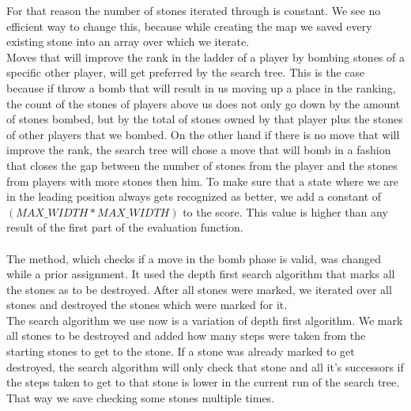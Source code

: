 For that reason the number of stones iterated through is constant. 
We see no efficient way to change this, because while creating the map we saved every existing stone into an array over which we iterate. \\\newpage
Moves that will improve the rank in the ladder of a player by bombing stones of a specific other player, will get preferred by the search tree.
This is the case because if throw a bomb that will result in us moving up a place in the ranking, the count of the stones of players above us does not only go down by the amount of stones bombed, but by the total of stones owned by that player plus the stones of other players that we bombed.
On the other hand if there is no move that will improve the rank, the search tree will chose a move that will bomb in a fashion that closes the gap between the number of stones from the player and the stones from players with more stones then him. To make sure that a state where we are in the leading position always gets recognized as better, we add a constant of $(MAX\_WIDTH*MAX\_WIDTH)$ to the score. This value is higher than any result of the first part of the evaluation function.\\\\
The method, which checks if a move in the bomb phase is valid, was changed while a prior assignment. 
It used the depth first search algorithm that marks all the stones as to be destroyed.
After all stones were marked, we iterated over all stones and destroyed the stones which were marked for it. \\
The search algorithm we use now is a variation of depth first algorithm. We mark all stones to be destroyed and added how many steps were taken from the starting stones to get to the stone.
If a stone was already marked to get destroyed, the search algorithm will only check that stone and all it's successors if the steps taken to get to that stone is lower in the current run of the search tree. \\
That way we save checking some stones multiple times.